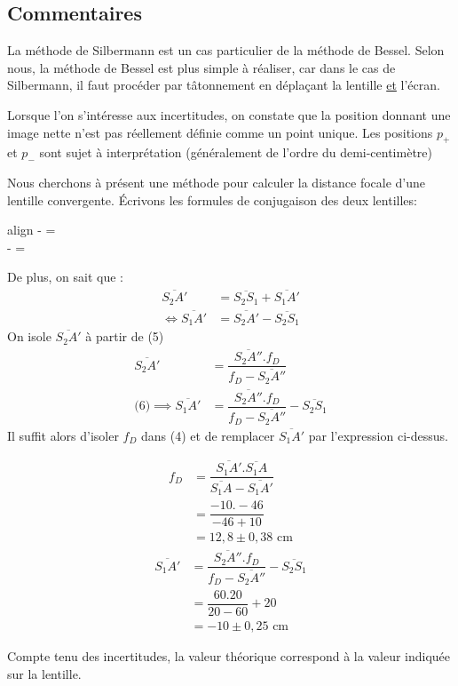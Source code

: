 \documentclass[12pt,a4paper]{article}
\begin{document}
	\subsection{Commentaires}
	La méthode de Silbermann est un cas particulier de la méthode de Bessel. Selon nous, la méthode de Bessel est plus simple à réaliser, car dans le cas de Silbermann, il faut procéder par tâtonnement en déplaçant la lentille \underline{et} l'écran.
	
	Lorsque l'on s'intéresse aux incertitudes, on constate que la position donnant une image nette n'est pas réellement définie comme un point unique. Les positions $p_+$ et $p_-$ sont sujet à interprétation (généralement de l'ordre du demi-centimètre)
	
	Nous cherchons à présent une méthode pour calculer la distance focale d'une lentille convergente. %
	Écrivons les formules de conjugaison des deux lentilles:
	\begin{empheq}[left=\empheqlbrace]{align}
	 - =  \\
	 - =  
	\end{empheq}
	De plus, on sait que :
	\begin{align}
	\overline{S_2A'} &= \overline{S_2S_1}+\overline{S_1A'} \nonumber \\
	\iff \overline{S_1A'}&=\overline{S_2A'}-\overline{S_2S_1} 
	\end{align}
	On isole $\overline{S_2A'}$ à partir de (5)\\
	\begin{align*}
	\overline{S_2A'}&=\dfrac{\overline{S_2A''}.f_D}{f_D-\overline{S_2A''}}\\[1em]
	\text{(6)}\implies \overline{S_1A'}&=\dfrac{\overline{S_2A''}.f_D}{f_D-\overline{S_2A''}}-\overline{S_2S_1}
	\end{align*}
	Il suffit alors d'isoler $f_D$ dans (4) et de remplacer $\overline{S_1A'}$ par l'expression ci-dessus.
	\begin{multicols}{2}
		\setlength\columnseprule{0.4pt}
		\begingroup
		\addtolength{\jot}{1em}
		\begin{align*}
		f_D&=\dfrac{\overline{S_1A'}.\overline{S_1A}}{\overline{S_1A}-\overline{S_1A'}}\\
		&=\dfrac{-10.-46}{-46+10}\\
		&=12,8\pm0,38\text{ cm}
		\end{align*}
		\vfill
		\columnbreak
		\begin{align*}
		\overline{S_1A'}&=\dfrac{\overline{S_2A''}.f_D}{f_D-\overline{S_2A''}}-\overline{S_2S_1}\\
		&=\dfrac{60.20}{20-60}+20\\
		&=-10\pm0,25\text{ cm}
		\end{align*}
		\endgroup
	\end{multicols}
	Compte tenu des incertitudes, la valeur théorique correspond à la valeur indiquée sur la lentille.
\end{document}
